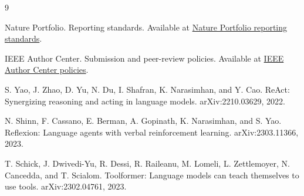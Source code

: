 \documentclass[11pt]{article}
\begin{document}
\begin{thebibliography}{9}

Nature Portfolio. Reporting standards. Available at \href{https://www.nature.com/nature-portfolio/editorial-policies/reporting-standards}{Nature Portfolio reporting standards}.

IEEE Author Center. Submission and peer-review policies. Available at \href{https://journals.ieeeauthorcenter.ieee.org/become-an-ieee-journal-author/publishing-ethics/guidelines-and-policies/submission-and-peer-review-policies/}{IEEE Author Center policies}.

S. Yao, J. Zhao, D. Yu, N. Du, I. Shafran, K. Narasimhan, and Y. Cao. ReAct: Synergizing reasoning and acting in language models. arXiv:2210.03629, 2022.

N. Shinn, F. Cassano, E. Berman, A. Gopinath, K. Narasimhan, and S. Yao. Reflexion: Language agents with verbal reinforcement learning. arXiv:2303.11366, 2023.

T. Schick, J. Dwivedi-Yu, R. Dessi, R. Raileanu, M. Lomeli, L. Zettlemoyer, N. Cancedda, and T. Scialom. Toolformer: Language models can teach themselves to use tools. arXiv:2302.04761, 2023.

\end{thebibliography}
\end{document}
